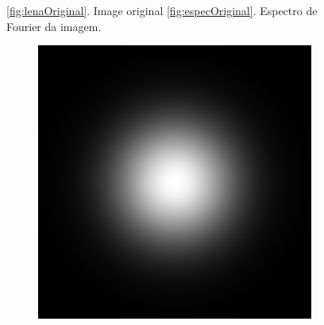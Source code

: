\documentclass[
	article,			%
	11pt,				%
	oneside,			%
	a4paper,			%
	english,			%
	brazil,				%
	sumario=tradicional
	]{abntex2}
\begin{document}
\begin{figure}
        \caption{ 
        \ref{fig:lenaOriginal}. Image original
        \ref{fig:especOriginal}. Espectro de Fourier da imagem.
        }
		\label{fig:lenaOriginalEspectro}
\end{figure}

\begin{figure}
		\centering
        \begin{subfigure}[b]{0.3\textwidth}
                \includegraphics[width=\textwidth,scale=1]{imagens/ex2/passaBaixa.png}
                \caption{}
                \label{fig:passaBaixa}
        \end{subfigure}%
        ~ %
        \begin{subfigure}[b]{0.3\textwidth}

\end{subfigure}
\end{figure}
\end{document}
